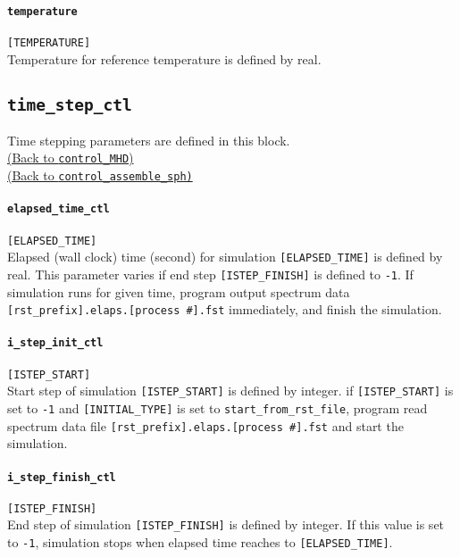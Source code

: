 \paragraph{\tt temperature}
\label{href_t:temperature}
\verb|[TEMPERATURE]| \\
Temperature for reference temperature is defined by real.


\subsection{\tt time\_step\_ctl}
\label{href_t:time_step_ctl}
Time stepping parameters are defined in this block. \\
\hyperref[href_i:time_step_ctl]{(Back to {\tt control\_MHD})} \\
\hyperref[href_i:time_step_ctl2]{(Back to {\tt control\_assemble\_sph)}}

\paragraph{\tt elapsed\_time\_ctl}
\label{href_t:elapsed_time_ctl}
\verb|[ELAPSED_TIME]| \\
Elapsed (wall clock) time (second) for simulation \verb|[ELAPSED_TIME]| is defined by real. 
This parameter varies if end step \verb|[ISTEP_FINISH]| is defined to {\tt -1}. If simulation runs for given time, program output spectrum data  \verb|[rst_prefix].elaps.[process #].fst| immediately, and finish the simulation.

\paragraph{\tt i\_step\_init\_ctl}
\label{href_t:i_step_init_ctl}
\verb|[ISTEP_START]| \\
Start step of simulation \verb|[ISTEP_START]| is defined by integer. if \verb|[ISTEP_START]| is set to {\tt -1} and \verb|[INITIAL_TYPE]| is set to \verb|start_from_rst_file|, program read spectrum data file \verb|[rst_prefix].elaps.[process #].fst| and start the simulation.

\paragraph{\tt i\_step\_finish\_ctl}
\label{href_t:i_step_finish_ctl}
\verb|[ISTEP_FINISH]| \\
End step of simulation \verb|[ISTEP_FINISH]| is defined by integer. If this value is set to  {\tt -1}, simulation stops when elapsed time reaches to \verb|[ELAPSED_TIME]|.

